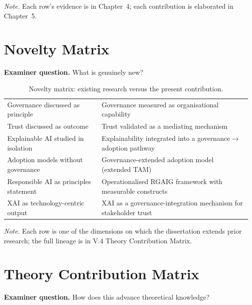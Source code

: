 \vspace{0.3em}\noindent\textit{Note.} Each row's evidence is in Chapter~4; each contribution is elaborated in Chapter~5.

\section{Novelty Matrix}
\label{app:distinction_novelty}

\noindent\textbf{Examiner question.} What is genuinely new?

{\tablestripes\tablefontsize
{}
\begin{xltabular}{\textwidth}{@{} >{\raggedright\arraybackslash}p{5.5cm} L @{}}
\caption[Novelty matrix]{Novelty matrix: existing research versus the present contribution.}\label{tab:dist_novelty} \\
\toprule
{} &  \\
\midrule
\endfirsthead
\endhead
\bottomrule
\endlastfoot
Governance discussed as principle & Governance measured as organisational capability \\
\addlinespace
Trust discussed as outcome & Trust validated as a mediating mechanism \\
\addlinespace
Explainable AI studied in isolation & Explainability integrated into a governance$\rightarrow$adoption pathway \\
\addlinespace
Adoption models without governance & Governance-extended adoption model (extended TAM) \\
\addlinespace
Responsible AI as principles statement & Operationalised RGAIG framework with measurable constructs \\
\addlinespace
XAI as technology-centric output & XAI as a governance-integration mechanism for stakeholder trust \\
\end{xltabular}}

\vspace{0.3em}\noindent\textit{Note.} Each row is one of the dimensions on which the dissertation extends prior research; the full lineage is in V.4 Theory Contribution Matrix.


\section{Theory Contribution Matrix}
\label{app:distinction_theory_contribution}

\noindent\textbf{Examiner question.} How does this advance theoretical knowledge?

